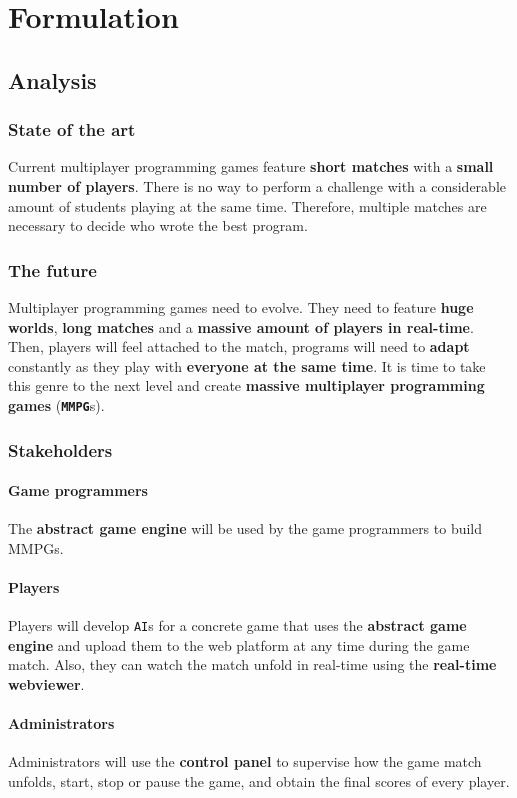 \documentclass[a4paper,11pt,titlepage,abstract,numbers=noenddot,automark,mnsy,intlimits,rgb,dvipsnames]{report}
\begin{document}
\part{Formulation}
\chapter{Analysis}
\section{State of the art}
Current multiplayer programming games feature \textbf{short matches} with a \textbf{small number of players}. There
is no way to perform a challenge with a considerable amount of students playing at the same time. Therefore, multiple
matches are necessary to decide who wrote the best program.
\section{The future}
Multiplayer programming games need to evolve. They need to feature \textbf{huge worlds}, \textbf{long matches} and
a \textbf{massive amount of players in real-time}. Then, players will feel attached to the match, programs will need to
\textbf{adapt} constantly as they play with \textbf{everyone at the same time}. It is time to take this genre to the next level and
create \textbf{massive multiplayer programming games} (\textbf{\texttt{MMPG}}s).
\section{Stakeholders}
\subsection{Game programmers}
The \textbf{abstract game engine} will be used by the game programmers to build MMPGs.
\subsection{Players}
Players will develop \texttt{AI}s for a concrete game that uses the \textbf{abstract game engine}
and upload them to the web platform at any time during the game match. Also, they can watch the match unfold
in real-time using the \textbf{real-time webviewer}.
\subsection{Administrators}
Administrators will use the \textbf{control panel} to supervise how the game match unfolds, start, stop or pause the game, and obtain
the final scores of every player.
\clearpage
\end{document}

